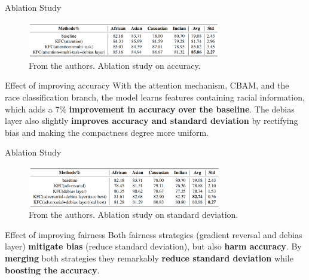 \documentclass[aspectratio=169,xcolor=dvipsnames]{beamer}
\begin{document}

\begin{frame}{Ablation Study}
    \begin{figure}
        \centering
        \includegraphics[width=0.75\textwidth]{imgs/5_Table2.png}
        \caption{From the authors. Ablation study on accuracy.}
        \label{fig:kfc-as1}
    \end{figure}
    \begin{block}{Effect of improving accuracy}
        With the attention mechanism, CBAM, and the race classification branch, the model learns features containing racial information, which adds a 7\% \textbf{improvement in accuracy over the baseline}. The debias layer also slightly \textbf{improves accuracy and standard deviation} by rectifying bias and making the compactness degree more uniform.
    \end{block}
\end{frame}


\begin{frame}{Ablation Study}
    \begin{figure}
        \centering
        \includegraphics[width=0.75\textwidth]{imgs/6_Table3.png}
        \caption{From the authors. Ablation study on standard deviation.}
        \label{fig:kfc-as2}
    \end{figure}
    \begin{block}{Effect of improving fairness}
        Both fairness strategies (gradient reversal and debias layer) \textbf{mitigate bias} (reduce standard deviation), but also \textbf{harm accuracy}. By \textbf{merging} both strategies they remarkably \textbf{reduce standard deviation} while \textbf{boosting the accuracy}.
    \end{block}
\end{frame}

\end{document}
